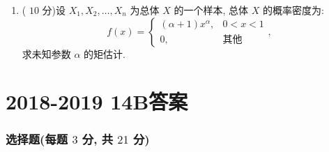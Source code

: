 \documentclass[cn,11pt,fancy,hide]{elegantbook}
\begin{document}
\begin{enumerate}
	\item ( $10$ 分)设 $X_1,X_2,\ldots,X_n$ 为总体 $X$ 的一个样本, 总体 $X$ 的概率密度为:
	\begin{equation*}
		f(x)=
		\begin{cases}
		(\alpha+1)x^\alpha, & 0<x<1\\
		0, & \text{其他}
		\end{cases},
	\end{equation*}
	求未知参数 $\alpha$ 的矩估计.
\end{enumerate}

\section{2018-2019 14B答案}
\subsubsection{选择题(每题 $3$ 分, 共 $21$ 分)}
\end{document}
